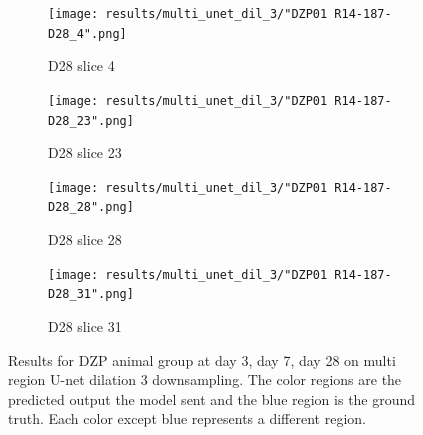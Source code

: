 \begin{figure}[!htb]
\medskip
\begin{subfigure}{0.25\textwidth}
  \texttt{[image: results/multi\_unet\_dil\_3/"DZP01 R14-187-D28\_4".png]}
  \caption{D28 slice 4}
\end{subfigure}\hfil %
\begin{subfigure}{0.25\textwidth}
  \texttt{[image: results/multi\_unet\_dil\_3/"DZP01 R14-187-D28\_23".png]}
  \caption{D28 slice 23}
\end{subfigure}\hfil %
\begin{subfigure}{0.25\textwidth}
  \texttt{[image: results/multi\_unet\_dil\_3/"DZP01 R14-187-D28\_28".png]}
  \caption{D28 slice 28}
\end{subfigure}\hfil %
\begin{subfigure}{0.25\textwidth}
  \texttt{[image: results/multi\_unet\_dil\_3/"DZP01 R14-187-D28\_31".png]}
  \caption{D28 slice 31}
\end{subfigure}
  
  \caption{Results for DZP animal group at day 3, day 7, day 28 on multi region U-net dilation 3 downsampling. The color regions are the predicted output the model sent and the blue region is the ground truth. Each color except blue represents a different region.}
  \label{fig:results_multi_unetdil3_DZP}
\end{figure}



